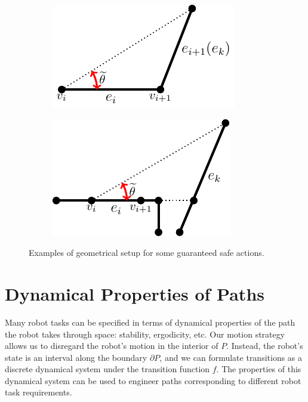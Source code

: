\documentclass[sageh,times,Review]{sagej}
\begin{document}
\begin{figure}
\centering
\begin{subfigure}{0.5\columnwidth}
\centering
\includegraphics[width=0.9\columnwidth]{tikz2.pdf}
\end{subfigure}%
\begin{subfigure}{0.5\columnwidth}
\centering
\includegraphics[width=0.9\columnwidth]{tikz3.pdf}
\end{subfigure}
\caption{Examples of geometrical setup for some guaranteed safe actions.}
\label{fig:two_safe_cases}
\end{figure}


\section{Dynamical Properties of Paths} \label{secdyn}


Many robot tasks can be specified in terms of dynamical properties of
the path the robot takes through space: stability, ergodicity, etc.
Our motion strategy allows us to disregard the robot's motion in the interior of
$P$. Instead, the robot's state is an interval 
along the boundary $\partial P$, and we can formulate transitions as a discrete
dynamical system under the transition function $f$. The properties of this
dynamical system can be used to engineer paths corresponding to different robot
task requirements.
\end{document}
